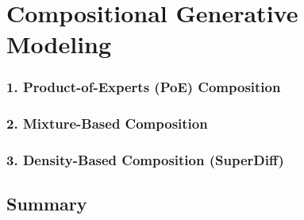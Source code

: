 \section{Compositional Generative Modeling}
\label{sec:compositional_generative_modeling}

\subsubsection*{1. Product-of-Experts (PoE) Composition}

\subsubsection*{2. Mixture-Based Composition}

\subsubsection*{3. Density-Based Composition (SuperDiff)}

\subsection*{Summary}
